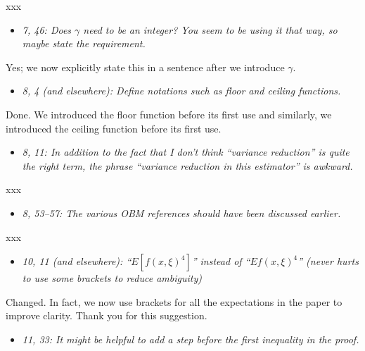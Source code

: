 \documentclass[11pt,notitlepage,onecolumn]{article}
\newcommand{\noi}{\noindent}
\begin{document}
\noi
xxx  
\medskip 



\begin{itemize}
\item[] \textit{7, 46: Does $\gamma$ need to be an integer? 
You seem to be using it that way, so maybe state the requirement.}
\end{itemize}

\noi
Yes; we now explicitly state this in a sentence after we introduce $\gamma$. 
\medskip 



\begin{itemize}
\item[] \textit{8, 4 (and elsewhere): Define notations such as floor and ceiling functions.}
\end{itemize}

\noi
Done. 
We introduced the floor function before its first use and similarly, we introduced the ceiling function before its first use. 
\medskip 



\begin{itemize}
\item[] \textit{8, 11: In addition to the fact that I don't think ``variance reduction'' is quite the right term, the phrase ``variance reduction in this estimator'' is awkward.}
\end{itemize}

\noi
xxx  
\medskip 



\begin{itemize}
\item[] \textit{8, 53--57: The various OBM references should have been discussed earlier.}
\end{itemize}

\noi
xxx  
\medskip 



\begin{itemize}
\item[] \textit{10, 11 (and elsewhere): ``$E[f(x, \xi)^4]$'' instead of ``$Ef(x, \xi)^4$'' (never hurts to use some brackets to reduce ambiguity)}
\end{itemize}

\noi
Changed.
In fact, we now use brackets for all the expectations in the paper to improve clarity.
Thank you for this suggestion. 
\medskip 



\begin{itemize}
\item[] \textit{11, 33: It might be helpful to add a step before the first inequality in the proof.}
\end{itemize}
\end{document}
